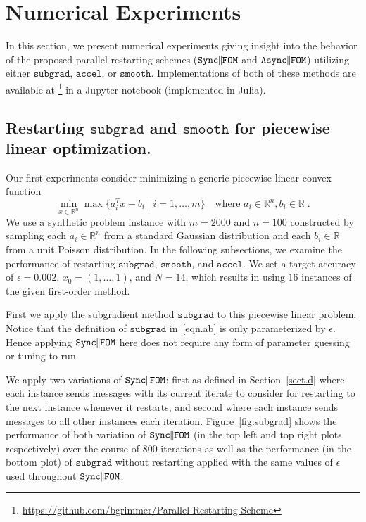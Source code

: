 \documentclass[reqno, 11pt]{amsart}
\numberwithin{equation}{section}
\newcommand{\nt}{\negthinspace}
\newcommand{\parfom}{\parallel \nt \nt  \mathtt{FOM}}
\newcommand{\sparfom}{\mathtt{Sync} \nt \nt  \parfom}
\newcommand{\aparfom}{\mathtt{Async} \nt \nt \parfom}
\begin{document}
\section{{\bf Numerical Experiments}}  \label{sect.i}  
In this section, we present numerical experiments giving insight into the behavior of the proposed parallel restarting schemes ($\sparfom$ and $\aparfom$) utilizing either $\mathtt{subgrad}$, $\mathtt{accel}$, or $\mathtt{smooth}$. Implementations of both of these methods are available at \footnote{\url{https://github.com/bgrimmer/Parallel-Restarting-Scheme}} in a Jupyter notebook (implemented in Julia). 

\subsection{Restarting $\mathtt{subgrad}$ and $\mathtt{smooth}$ for piecewise linear optimization.}
Our first experiments consider minimizing a generic piecewise linear convex function
\begin{equation}\label{eq:pl-obj}
\min_{x\in\mathbb{R}^n} \max \{ a_i^T x - b_i \mid i = 1, \ldots, m \}  \quad \textrm{where  }  a_i \in \mathbb{R}^n,  b_i \in \mathbb{R} \; .
\end{equation}
We use a synthetic problem instance with $m=2000$ and $n=100$ constructed by sampling each $a_i\in\mathbb{R}^{n}$ from a standard Gaussian distribution and each $b_i\in\mathbb{R}$ from a unit Poisson distribution. In the following subsections, we examine the performance of restarting $\mathtt{subgrad}$, $\mathtt{smooth}$, and $\mathtt{accel}$.
We set a target accuracy of $\epsilon=0.002$, $x_0=(1,\dots,1)$, and $N=14$, which results in using $16$ instances of the given first-order method.

First we apply the subgradient method $\mathtt{subgrad}$ to this piecewise linear problem. Notice that the definition of $\mathtt{subgrad}$ in~\eqref{eqn.ab} is only parameterized by $\epsilon$. Hence applying $\sparfom$ here does not require any form of parameter guessing or tuning to run.


We apply two variations of $\sparfom$: first as defined in Section~\ref{sect.d} where each instance sends messages with its current iterate to consider for restarting to the next instance whenever it restarts, and second where each instance sends messages to all other instances each iteration. Figure~\ref{fig:subgrad} shows the performance of both variation of $\sparfom$ (in the top left and top right plots respectively) over the course of $800$ iterations as well as the performance (in the bottom plot) of $\mathtt{subgrad}$ without restarting applied with the same values of $\epsilon$ used throughout $\sparfom$.
\end{document}
